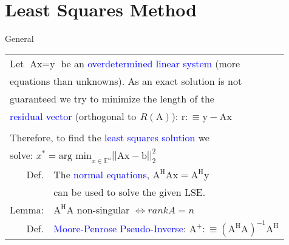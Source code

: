 \section{Least Squares Method}
\begin{mainbox}{General}
\setlength{\tabcolsep}{2pt}
\begin{tabular}{rl}
	\multicolumn{2}{l}{Let $\text{Ax} = \text{y}$ be an \textcolor{blue}{overdetermined linear system} (more}\\
	\multicolumn{2}{l}{equations than unknowns). As an exact solution is not}\\
	\multicolumn{2}{l}{guaranteed we try to minimize the length of the}\\
	\multicolumn{2}{l}{\textcolor{blue}{residual vector} (orthogonal to $^{}R(\text{A})$): $\text{r} :\equiv \text{y} - \text{Ax}$}\\
	\\
	\multicolumn{2}{l}{Therefore, to find the \textcolor{blue}{least squares solution} we}\\
	\multicolumn{2}{l}{solve: $x^* = \text{arg min}_{x\in\mathbb{E}^n}||\text{Ax}-\text{b}||_2^2$}\\
	\rule{0pt}{3ex}
	Def. & The \textcolor{blue}{normal equations}, $\text{A}^\text{H}\text{Ax} = \text{A}^\text{H}\text{y}$\\
	& can be used to solve the given LSE.\\
	Lemma: & $\text{A}^\text{H}\text{A}$ non-singular $\Leftrightarrow rankA = n$\\
	\rule{0pt}{3ex}
	Def. & \textcolor{blue}{Moore-Penrose Pseudo-Inverse}: $\text{A}^+ :\equiv (\text{A}^\text{H}\text{A})^{-1}\text{A}^\text{H}$\\
\end{tabular}
\end{mainbox}